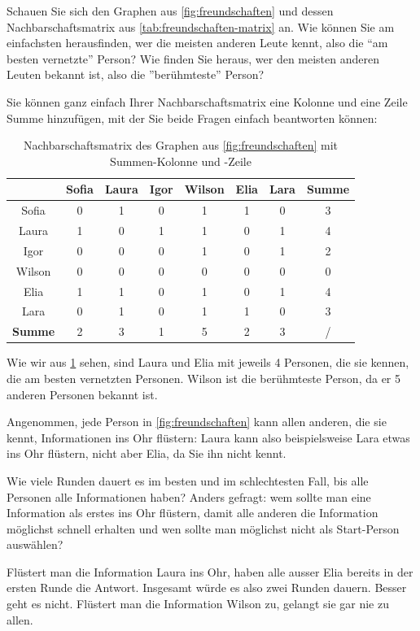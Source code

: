\begin{myexercise}
Schauen Sie sich den Graphen aus \cref{fig:freundschaften} und dessen Nachbarschaftsmatrix aus \cref{tab:freundschaften-matrix} an. Wie können Sie am einfachsten herausfinden, wer die meisten anderen Leute kennt, also die ``am besten vernetzte'' Person? Wie finden Sie heraus, wer den meisten anderen Leuten bekannt ist, also die ''berühmteste'' Person?
\begin{myanswer}
Sie können ganz einfach Ihrer Nachbarschaftsmatrix eine Kolonne und eine Zeile Summe hinzufügen, mit der Sie beide Fragen einfach beantworten können:

\begin{table}[H]
\centering
\begin{tabular}{c||c|c|c|c|c|c||c}
        & Sofia & Laura & Igor & Wilson & Elia & Lara & \textbf{Summe}\\ \midrule
Sofia     & 0 & 1 & 0 & 1 & 1 & 0&3 \\ \hline
Laura & 1 & 0 & 1 & 1 & 0 & 1 &4\\ \hline
Igor     & 0 & 0 & 0 & 1 & 0 & 1&2 \\ \hline
Wilson    & 0 & 0 & 0 & 0 & 0 & 0 & 0\\ \hline
Elia    & 1 & 1 & 0 & 1 & 0 & 1&4 \\ \hline
Lara     & 0 & 1 & 0 & 1 & 1 & 0 &3\\ \midrule\midrule
\textbf{Summe} &2&3&1&5&2&3&/\\
\end{tabular}
\caption{Nachbarschaftsmatrix des Graphen aus \cref{fig:freundschaften} mit Summen-Kolonne und -Zeile}
\label{tab:freundschaften-matrix-sum}
\end{table}
Wie wir aus \cref{tab:freundschaften-matrix-sum} sehen, sind Laura und Elia mit jeweils 4 Personen, die sie kennen, die am besten vernetzten Personen. Wilson ist die berühmteste Person, da er 5 anderen Personen bekannt ist.

\end{myanswer}
\end{myexercise}

\begin{myexercise}
Angenommen, jede Person in \cref{fig:freundschaften} kann allen anderen, die sie kennt, Informationen ins Ohr flüstern: Laura kann also beispielsweise Lara etwas ins Ohr flüstern, nicht aber Elia, da Sie ihn nicht kennt. 

Wie viele Runden dauert es im besten und im schlechtesten Fall, bis alle Personen alle Informationen haben? Anders gefragt: wem sollte man eine Information als erstes ins Ohr flüstern, damit alle anderen die Information möglichst schnell erhalten und wen sollte man möglichst nicht als Start-Person auswählen?

\begin{myanswer}
Flüstert man die Information Laura ins Ohr, haben alle ausser Elia bereits in der ersten Runde die Antwort. Insgesamt würde es also zwei Runden dauern. Besser geht es nicht. Flüstert man die Information Wilson zu, gelangt sie gar nie zu allen.
\end{myanswer}
\end{myexercise}

